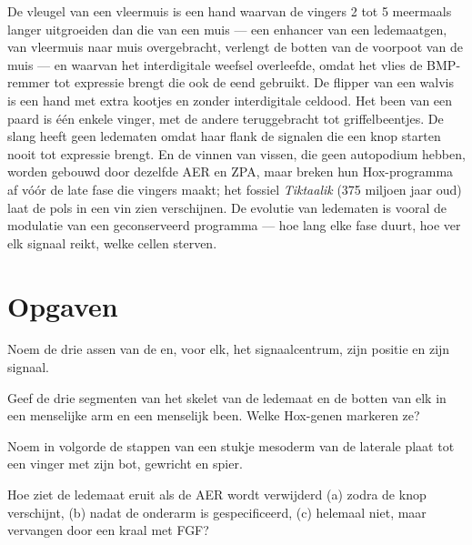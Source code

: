 \begin{example}\label{ex:b2:limb-organogenesis:evolution}
De vleugel van een vleermuis is een hand waarvan de vingers 2 tot 5
meermaals langer uitgroeiden dan die van een muis --- een enhancer van een
ledemaatgen, van vleermuis naar muis overgebracht, verlengt de botten van de
voorpoot van de muis --- en waarvan het interdigitale weefsel overleefde,
omdat het vlies de BMP-remmer tot expressie brengt die ook de eend
gebruikt. De flipper van een walvis is een hand met extra kootjes en zonder
interdigitale celdood. Het been van een paard is één enkele vinger, met de
andere teruggebracht tot griffelbeentjes. De slang heeft geen ledematen omdat
haar flank de signalen die een knop starten nooit tot expressie brengt. En
de vinnen van vissen, die geen autopodium hebben, worden gebouwd door
dezelfde AER en ZPA, maar breken hun Hox-programma af vóór de late fase die
vingers maakt; het fossiel \emph{Tiktaalik} (375 miljoen jaar oud) laat de
pols in een vin zien verschijnen. De evolutie van ledematen is vooral de
modulatie van een geconserveerd programma --- hoe lang elke fase duurt, hoe
ver elk signaal reikt, welke cellen sterven.
\end{example}

\section{Opgaven}

\begin{exercise}[$\star$]\label{exo:b2:limb-organogenesis:1}
Noem de drie assen van de  en, voor elk, het signaalcentrum, zijn
positie en zijn signaal.
\end{exercise}

\begin{exercise}[$\star$]\label{exo:b2:limb-organogenesis:2}
Geef de drie segmenten van het skelet van de ledemaat en de botten van elk
in een menselijke arm en een menselijk been. Welke Hox-genen markeren ze?
\end{exercise}

\begin{exercise}[$\star$]\label{exo:b2:limb-organogenesis:3}
Noem in volgorde de stappen van een stukje mesoderm van de laterale plaat
tot een vinger met zijn bot, gewricht en spier.
\end{exercise}

\begin{exercise}[$\star$]\label{exo:b2:limb-organogenesis:4}
Hoe ziet de ledemaat eruit als de AER wordt verwijderd (a) zodra de knop
verschijnt, (b) nadat de onderarm is gespecificeerd, (c) helemaal niet,
maar vervangen door een kraal met FGF?
\end{exercise}

